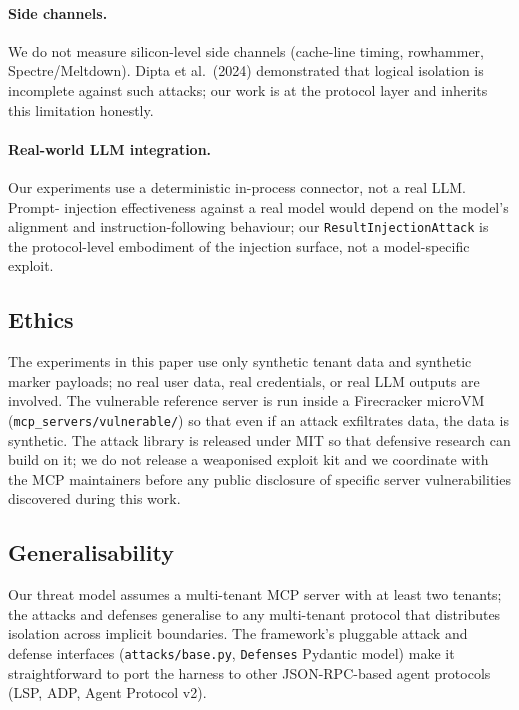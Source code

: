 \paragraph{Side channels.} We do not measure silicon-level
side channels (cache-line timing, rowhammer, Spectre/Meltdown).
Dipta et al.~(2024) demonstrated that logical isolation is
incomplete against such attacks; our work is at the protocol
layer and inherits this limitation honestly.

\paragraph{Real-world LLM integration.} Our experiments use a
deterministic in-process connector, not a real LLM. Prompt-
injection effectiveness against a real model would depend on
the model's alignment and instruction-following behaviour;
our \texttt{ResultInjectionAttack} is the protocol-level
embodiment of the injection surface, not a model-specific
exploit.

\subsection{Ethics}

The experiments in this paper use only synthetic tenant data
and synthetic marker payloads; no real user data, real
credentials, or real LLM outputs are involved. The vulnerable
reference server is run inside a Firecracker microVM
(\texttt{mcp\_servers/vulnerable/}) so that even if an attack
exfiltrates data, the data is synthetic. The attack library is
released under MIT so that defensive research can build on it;
we do not release a weaponised exploit kit and we coordinate
with the MCP maintainers before any public disclosure of
specific server vulnerabilities discovered during this work.

\subsection{Generalisability}

Our threat model assumes a multi-tenant MCP server with at
least two tenants; the attacks and defenses generalise to any
multi-tenant protocol that distributes isolation across
implicit boundaries. The framework's pluggable attack and
defense interfaces (\texttt{attacks/base.py},
\texttt{Defenses} Pydantic model) make it straightforward to
port the harness to other JSON-RPC-based agent protocols
(LSP, ADP, Agent Protocol v2).

